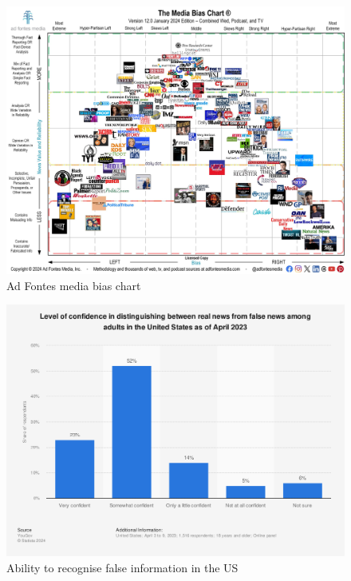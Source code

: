 \begin{figure}[htbp]
    \centering
    \includegraphics[width=0.8\linewidth]{images/Media-Bias-Chart-12.0_Jan-2024-Licensed-scaled.jpg}
    \caption{Ad Fontes media bias chart}
    \label{fig:adfontes-media-bias-chart}
\end{figure}

\begin{figure}[htbp]
    \centering
    \includegraphics[width=0.9\linewidth]{images/statistic_id657090_ability-to-recognize-false-information-and-news-in-the-us-2023.png}
    \caption{Ability to recognise false information in the US \cite{yougov-2023-confidence}}
    \label{fig:ability-to-recognize-false-information-and-news-in-the-us-2023}
\end{figure}


